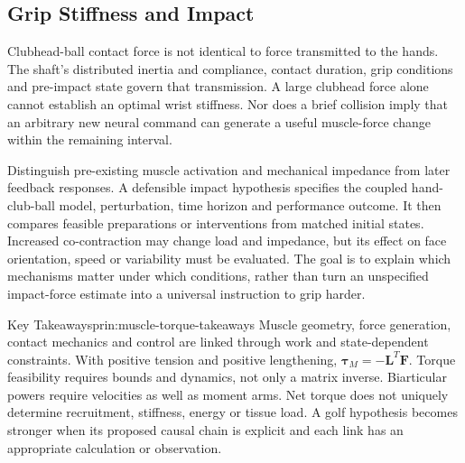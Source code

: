 \subsection{Grip Stiffness and Impact}

Clubhead-ball contact force is not identical to force transmitted to the hands. The shaft's distributed inertia and compliance, contact duration, grip conditions and pre-impact state govern that transmission. A large clubhead force alone cannot establish an optimal wrist stiffness. Nor does a brief collision imply that an arbitrary new neural command can generate a useful muscle-force change within the remaining interval.

Distinguish pre-existing muscle activation and mechanical impedance from later feedback responses. A defensible impact hypothesis specifies the coupled hand-club-ball model, perturbation, time horizon and performance outcome. It then compares feasible preparations or interventions from matched initial states. Increased co-contraction may change load and impedance, but its effect on face orientation, speed or variability must be evaluated. The goal is to explain which mechanisms matter under which conditions, rather than turn an unspecified impact-force estimate into a universal instruction to grip harder.

\begin{principle}{Key Takeaways}{prin:muscle-torque-takeaways}
Muscle geometry, force generation, contact mechanics and control are linked through work and state-dependent constraints. With positive tension and positive lengthening, $\bm\tau_M=-\bm L^T\bm F$. Torque feasibility requires bounds and dynamics, not only a matrix inverse. Biarticular powers require velocities as well as moment arms. Net torque does not uniquely determine recruitment, stiffness, energy or tissue load. A golf hypothesis becomes stronger when its proposed causal chain is explicit and each link has an appropriate calculation or observation.
\end{principle}

